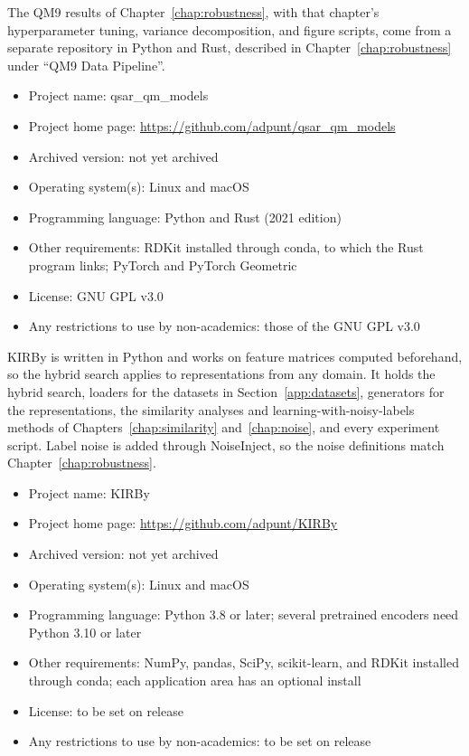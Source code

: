 The QM9 results of Chapter~\ref{chap:robustness}, with that chapter's hyperparameter tuning, variance decomposition, and figure scripts, come from a separate repository in Python and Rust, described in Chapter~\ref{chap:robustness} under ``QM9 Data Pipeline''.

\begin{itemize}
    \item Project name: qsar\_qm\_models
    \item Project home page: \url{https://github.com/adpunt/qsar_qm_models}
    \item Archived version: not yet archived
    \item Operating system(s): Linux and macOS
    \item Programming language: Python and Rust (2021 edition)
    \item Other requirements: RDKit installed through conda, to which the Rust program links; PyTorch and PyTorch Geometric
    \item License: GNU GPL v3.0
    \item Any restrictions to use by non-academics: those of the GNU GPL v3.0
\end{itemize}

KIRBy is written in Python and works on feature matrices computed beforehand, so the hybrid search applies to representations from any domain. It holds the hybrid search, loaders for the datasets in Section~\ref{app:datasets}, generators for the representations, the similarity analyses and learning-with-noisy-labels methods of Chapters~\ref{chap:similarity} and~\ref{chap:noise}, and every experiment script. Label noise is added through NoiseInject, so the noise definitions match Chapter~\ref{chap:robustness}.

\begin{itemize}
    \item Project name: KIRBy
    \item Project home page: \url{https://github.com/adpunt/KIRBy}
    \item Archived version: not yet archived
    \item Operating system(s): Linux and macOS
    \item Programming language: Python 3.8 or later; several pretrained encoders need Python 3.10 or later
    \item Other requirements: NumPy, pandas, SciPy, scikit-learn, and RDKit installed through conda; each application area has an optional install
    \item License: to be set on release
    \item Any restrictions to use by non-academics: to be set on release
\end{itemize}


